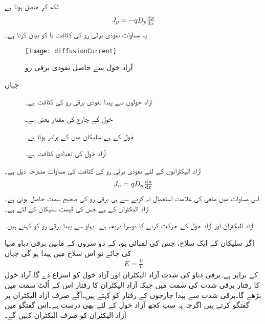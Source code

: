 لکھ کر حاصل ہوتا ہے
\begin{align}
J_p = -q D_p \od{p}{x}
\end{align}
یہ مساوات نفوذی برقی رو کی کثافت یا  کو بیان کرتا ہے۔
\begin{figure}
\centering
\texttt{[image: diffusionCurrent]}
\caption{  آزاد خول سے حاصل نفوذی برقی رو}
\label{شکل_آزاد_خول_سے_حاصل_برقی_رو}
\end{figure}
جہاں
\begin{description}
\item
[ ] آزاد خولوں سے پیدا نفوذی برقی رو کی کثافت  ہے۔
\item
[] خول کے چارج کی مقدار یعنی  ہے۔
\item
[] خول کے   ہے۔سلیکان میں کے برابر ہوتا ہے۔
\item
[] آزاد خول کی تعدادی کثافت ہے۔
\end{description}


آزاد الیکٹرانوں کے لئے نفوذی برقی رو کی کثافت کی مساوات مندرجہ ذیل ہے۔
\begin{align}
J_n = q D_n \od{n}{x}
\end{align}
اس مساوات میں منفی کی علامت استعمال نہ کرنے سے ہی برقی رو کی صحیح سمت حاصل ہوتی ہے۔  آزاد الیکٹران کے  ہے جس کی قیمت سلیکان کے لئے  ہے۔

	آزاد الیکٹران اور آزاد خول کے حرکت کرنے کا دوسرا ذریعہ  ہے ۔بہاو سے پیدا برقی رو کو   کہتے ہیں۔

اگر سلیکان کے ایک سلاخ، جس کی لمبائی  ہو، کے دو سروں کے مابین برقی دباو  مہیا کی جائے تو اس سلاخ میں    پیدا ہو گی جہاں
\begin{align*}
E=\frac{V}{L}
\end{align*}
کے برابر ہے۔برقی دباو کی شدت آزاد الیکٹران اور آزاد خول کو اسراع دے گا۔آزاد خول کا رفتار برقی شدت کی سمت میں جبکہ آزاد الیکٹران کا رفتار اس کے اُلٹ سمت میں بڑھے گا۔برقی شدت سے پیدا چارجوں کے رفتار کو   کہتے ہیں۔آگے صرف آزاد الیکٹران پر گفتگو کرتے ہیں اگرچہ  یہ سب کچھ آزاد خول کے لئے بھی درست ہے۔اس گفتگو میں آزاد الیکٹران کو صرف الیکٹران کہیں گے۔

